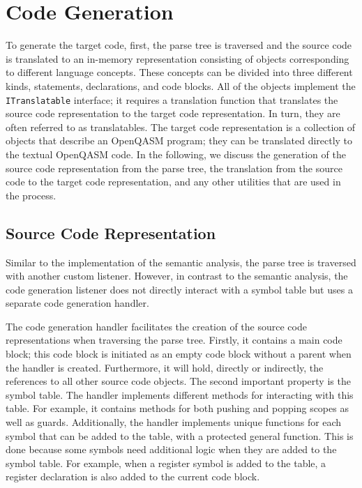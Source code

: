 \section{Code Generation}
\label{sec:implementation_codeGen}
To generate the target code, first, the parse tree is traversed and the source code is translated to an in-memory representation consisting of objects corresponding to different language concepts. These concepts can be divided into three different kinds, statements, declarations, and code blocks. All of the objects implement the \texttt{ITranslatable} interface; it requires a translation function that translates the source code representation to the target code representation. In turn, they are often referred to as translatables. The target code representation is a collection of objects that describe an OpenQASM program; they can be translated directly to the textual OpenQASM code. In the following, we discuss the generation of the source code representation from the parse tree, the translation from the source code to the target code representation, and any other utilities that are used in the process.

\subsection{Source Code Representation}
\label{sec:implementation_sourceCode}
Similar to the implementation of the semantic analysis, the parse tree is traversed with another custom listener. However, in contrast to the semantic analysis, the code generation listener does not directly interact with a symbol table but uses a separate code generation handler.

The code generation handler facilitates the creation of the source code representations when traversing the parse tree. Firstly, it contains a main code block; this code block is initiated as an empty code block without a parent when the handler is created. Furthermore, it will hold, directly or indirectly, the references to all other source code objects. The second important property is the symbol table. The handler implements different methods for interacting with this table. For example, it contains methods for both pushing and popping scopes as well as guards. Additionally, the handler implements unique functions for each symbol that can be added to the table, with a protected general function. This is done because some symbols need additional logic when they are added to the symbol table. For example, when a register symbol is added to the table, a register declaration is also added to the current code block.

